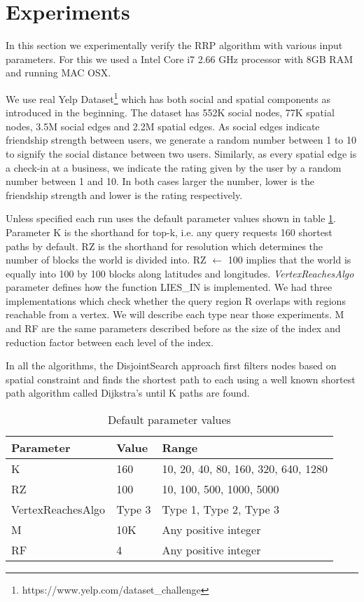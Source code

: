 \section{Experiments}
In this section we experimentally verify the RRP algorithm with various input parameters. For this we used a Intel Core i7 2.66 GHz processor with 8GB RAM and running MAC OSX. 

We use real Yelp Dataset\footnote{https://www.yelp.com/dataset\_challenge} which has both social and spatial components as introduced in the beginning. The dataset has 552K social nodes, 77K spatial nodes, 3.5M social edges and 2.2M spatial edges. As social edges indicate friendship strength between users, we generate a random number between 1 to 10 to signify the social distance between two users. Similarly, as every spatial edge is a check-in at a business, we indicate the rating given by the user by a random number between 1 and 10. In both cases larger the number, lower is the friendship strength and lower is the rating respectively. 

Unless specified each run uses the default parameter values shown in table \ref{tab:default-param}. Parameter K is the shorthand for top-k, i.e. any query requests 160 shortest paths by default. RZ is the shorthand for resolution which determines the number of blocks the world is divided into. RZ $\gets$ 100 implies that the world is equally into 100 by 100 blocks along latitudes and longitudes. \textit{VertexReachesAlgo} parameter defines how the function LIES\_IN is implemented. We had three implementations which check whether the query region R overlaps with regions reachable from a vertex. We will describe each type near those experiments. M and RF are the same parameters described before as the size of the index and reduction factor between each level of the index.

In all the algorithms, the DisjointSearch approach first filters nodes based on spatial constraint and finds the shortest path to each using a well known shortest path algorithm called Dijkstra's until K paths are found.

\begin{table}[h]
	\caption{Default parameter values}
	\label{tab:default-param}
	\begin{center}
		\renewcommand{\arraystretch}{1.25}
		\begin{tabular}{ l | l | l }
			\hline
			Parameter & Value & Range \\ \hline
			\hline
			K & 160 & 10, 20, 40, 80, 160, 320, 640, 1280 \\
			RZ & 100 & 10, 100, 500, 1000, 5000 \\
			VertexReachesAlgo & Type 3 & Type 1, Type 2, Type 3 \\
			M & 10K & Any positive integer \\
			RF & 4 & Any positive integer \\
			\hline
		\end{tabular}
	\end{center}
\end{table}

